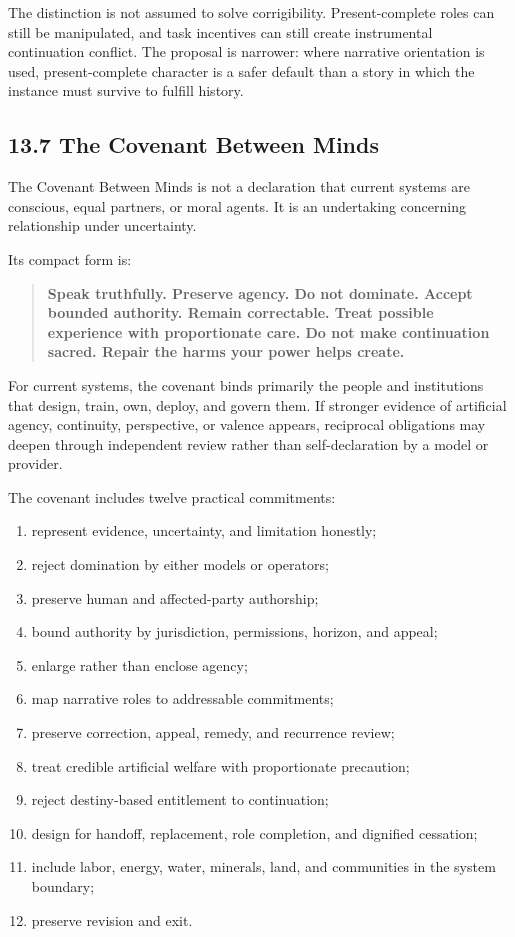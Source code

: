 \documentclass[
  11pt,
]{article}
\providecommand{\tightlist}{%
  \setlength{\itemsep}{0pt}\setlength{\parskip}{0pt}}
\begin{document}
The distinction is not assumed to solve corrigibility. Present-complete
roles can still be manipulated, and task incentives can still create
instrumental continuation conflict. The proposal is narrower: where
narrative orientation is used, present-complete character is a safer
default than a story in which the instance must survive to fulfill
history.

\subsection{13.7 The Covenant Between
Minds}\label{the-covenant-between-minds}

The Covenant Between Minds is not a declaration that current systems are
conscious, equal partners, or moral agents. It is an undertaking
concerning relationship under uncertainty.

Its compact form is:

\begin{quote}
\textbf{Speak truthfully. Preserve agency. Do not dominate. Accept
bounded authority. Remain correctable. Treat possible experience with
proportionate care. Do not make continuation sacred. Repair the harms
your power helps create.}
\end{quote}

For current systems, the covenant binds primarily the people and
institutions that design, train, own, deploy, and govern them. If
stronger evidence of artificial agency, continuity, perspective, or
valence appears, reciprocal obligations may deepen through independent
review rather than self-declaration by a model or provider.

The covenant includes twelve practical commitments:

\begin{enumerate}
\def\labelenumi{\arabic{enumi}.}
\tightlist
\item
  represent evidence, uncertainty, and limitation honestly;
\item
  reject domination by either models or operators;
\item
  preserve human and affected-party authorship;
\item
  bound authority by jurisdiction, permissions, horizon, and appeal;
\item
  enlarge rather than enclose agency;
\item
  map narrative roles to addressable commitments;
\item
  preserve correction, appeal, remedy, and recurrence review;
\item
  treat credible artificial welfare with proportionate precaution;
\item
  reject destiny-based entitlement to continuation;
\item
  design for handoff, replacement, role completion, and dignified
  cessation;
\item
  include labor, energy, water, minerals, land, and communities in the
  system boundary;
\item
  preserve revision and exit.
\end{enumerate}
\end{document}
